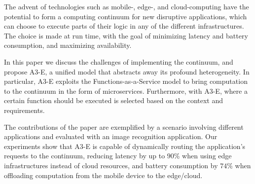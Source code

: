 The advent of technologies such as mobile-, edge-, and cloud-computing have the potential to form a computing continuum for new disruptive applications, which can choose to execute parts of their logic in any of the different infrastructures. The choice is made at run time, with the goal of minimizing latency and battery consumption, and maximizing availability.

In this paper we discuss the challenges of implementing the continuum, and propose A3-E, a unified model that abstracts away its profound heterogeneity. In particular, A3-E exploits the Functions-as-a-Service model to bring computation to the continuum in the form of microservices. Furthermore, with A3-E, where a certain function should be executed is selected based on the context and requirements.

The contributions of the paper are exemplified by a scenario involving different applications and evaluated with an image recognition application. Our experiments show that A3-E is capable of dynamically routing the application's requests to the continuum, reducing latency by up to $90$\% when using edge infrastructures instead of cloud resources, and battery consumption by $74$\% when offloading computation from the mobile device to the edge/cloud.




